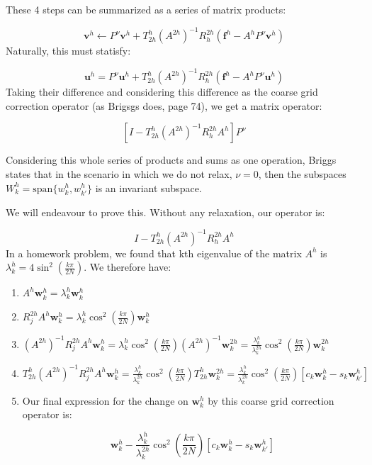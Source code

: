 \documentclass[pdftex,12pt,a4paper]{article}
\begin{document}
These 4 steps can be summarized as a series of matrix products: 

\begin{equation}
\mathbf{v}^h \leftarrow P^{\nu} \mathbf{v}^h + T_{2h}^h (A^{2h})^{-1} R_h^{2h} ( \mathbf{f}^h -  A^h P^{\nu} \mathbf{v}^h )
\end{equation}
Naturally, this must statisfy: 

\begin{equation}
\mathbf{u}^h = P^{\nu} \mathbf{u}^h + T_{2h}^h (A^{2h})^{-1} R_h^{2h} ( \mathbf{f}^h -  A^h P^{\nu} \mathbf{u}^h )
\end{equation}
Taking their difference and considering this difference as the coarse grid correction operator (as Brigsgs does, page 74), we get a matrix operator: 

\begin{equation}
\left[ I - T_{2h}^h (A^{2h})^{-1} R_h^{2h} A^h \right] P^{\nu}
\end{equation}

Considering this whole series of products and sums as one operation, Briggs states that in the scenario in which we do not relax, $\nu = 0$, then the subspaces $W_k^h = \text{span} \{w_k^h, w_{k'}^h \}$ is an invariant subspace.  


We will endeavour to prove this.  Without any relaxation, our operator is: 

$$
I - T_{2h}^h (A^{2h})^{-1} R_h^{2h} A^h
$$
In a homework problem, we found that kth eigenvalue of the matrix $A^h$ is $\lambda_k^h = 4 \sin^2 \left( \frac{k \pi}{2N} \right)$.  We therefore have: 

\begin{enumerate} 
\item $ A^h \mathbf{w}_k^h = \lambda_k^h \mathbf{w}_k^h$
\item $ R_j^{2h}A^h \mathbf{w}_k^h  = \lambda_k^h \cos^2 \left( \frac{k \pi}{2N}\right) \mathbf{w}_k^h $
\item $ (A^{2h} )^{-1} R_j^{2h}A^h \mathbf{w}_k^h = \lambda_k^h \cos^2 \left( \frac{k \pi}{2N}\right) (A^{2h})^{-1} \mathbf{w}_k^{2h} = \frac{\lambda_k^h}{\lambda_k^{2h}} \cos^2\left( \frac{k \pi}{2N}\right)\mathbf{w}_k^{2h}$

\item $T_{2h}^h(A^{2h} )^{-1} R_j^{2h}A^h \mathbf{w}_k^h =  \frac{\lambda_k^h}{\lambda_k^{2h}} \cos^2\left( \frac{k \pi}{2N}\right) T_{2h}^h \mathbf{w}_k^{2h} =
\frac{\lambda_k^h}{\lambda_k^{2h}} \cos^2\left( \frac{k \pi}{2N}\right) \left[ c_k \mathbf{w}_k^h - s_k \mathbf{w}_{k'}^h \right]$
\item Our final expression for the change on $\mathbf{w}_k^h$ by this coarse grid correction operator is: 

$$
\mathbf{w}_k^h - \frac{\lambda_k^h}{\lambda_k^{2h}} \cos^2\left( \frac{k \pi}{2N}\right) \left[ c_k \mathbf{w}_k^h - s_k \mathbf{w}_{k'}^h \right]
$$ 

\end{enumerate}
\end{document}
